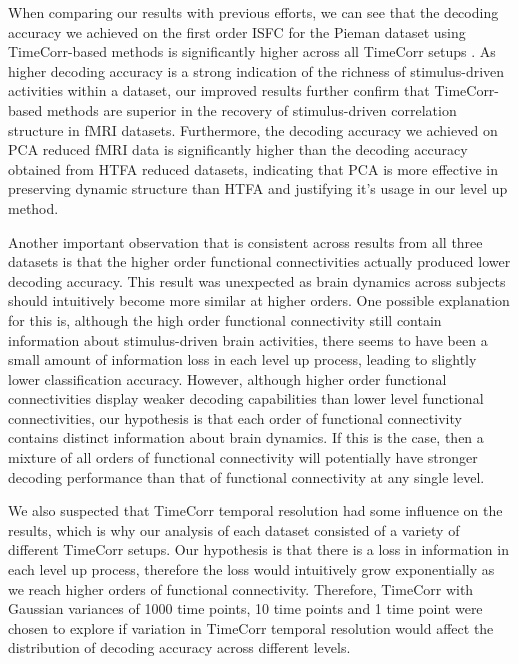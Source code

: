 \documentclass[11pt]{article}
\begin{document}
When comparing our results with previous efforts, we can see that the decoding accuracy we achieved on the first order ISFC for the Pieman dataset using TimeCorr-based methods is significantly higher across all TimeCorr setups \cite{jeremy2017}. As higher decoding accuracy is a strong indication of the richness of stimulus-driven activities within a dataset, our improved results further confirm that TimeCorr-based methods are superior in the recovery of stimulus-driven correlation structure in fMRI datasets. Furthermore, the decoding accuracy we achieved on PCA reduced fMRI data is significantly higher than the decoding accuracy obtained from HTFA reduced datasets, indicating that PCA is more effective in preserving dynamic structure than HTFA and justifying it's usage in our level up method.

Another important observation that is consistent across results from all three datasets is that the higher order functional connectivities actually produced lower decoding accuracy. This result was unexpected as brain dynamics across subjects should intuitively become more similar at higher orders. One possible explanation for this is, although the high order functional connectivity still contain information about stimulus-driven brain activities, there seems to have been a small amount of information loss in each level up process, leading to slightly lower classification accuracy. However, although higher order functional connectivities display weaker decoding capabilities than lower level functional connectivities, our hypothesis is that each order of functional connectivity contains distinct information about brain dynamics. If this is the case, then a mixture of all orders of functional connectivity will potentially have stronger decoding performance than that of functional connectivity at any single level.

We also suspected that TimeCorr temporal resolution had some influence on the results, which is why our analysis of each dataset consisted of a variety of different TimeCorr setups. Our hypothesis is that there is a loss in information in each level up process, therefore the loss would intuitively grow exponentially as we reach higher orders of functional connectivity. Therefore, TimeCorr with Gaussian variances of 1000 time points, 10 time points and 1 time point were chosen to explore if variation in TimeCorr temporal resolution would affect the distribution of decoding accuracy across different levels.
\end{document}
